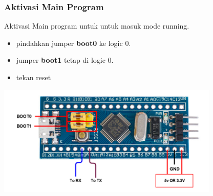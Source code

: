 \documentclass[table,dvipsnames]{beamer}
\begin{document}
	\begin{frame}
		\frametitle{Aktivasi Main Program}
		\begin{block}{}
			Aktivasi Main program untuk untuk masuk mode running.
			\begin{itemize}
				\item pindahkan jumper \textbf{boot0} ke logic 0.
				\item jumper \textbf{boot1} tetap di logic 0.
				\item tekan reset
			\end{itemize}
		\end{block}
		
		\begin{center}
			\includegraphics[width=300pt]{images/flashing}
		\end{center}
	\end{frame}
\end{document}
